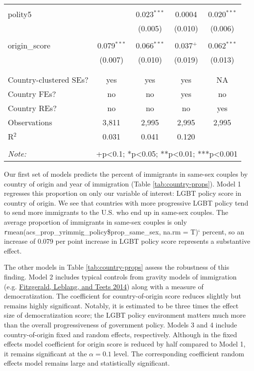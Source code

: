\documentclass[
  11pt,
]{article}
\begin{document}
\begin{table}[!htbp]
\begin{tabular}{@{\extracolsep{5pt}}lcccc}
  & & & & \\ 
 polity5 &  & 0.023$^{***}$ & 0.0004 & 0.020$^{***}$ \\ 
  &  & (0.005) & (0.010) & (0.006) \\ 
  & & & & \\ 
 origin\_score & 0.079$^{***}$ & 0.066$^{***}$ & 0.037$^{+}$ & 0.062$^{***}$ \\ 
  & (0.007) & (0.010) & (0.019) & (0.013) \\ 
  & & & & \\ 
\hline \\[-1.8ex] 
Country-clustered SEs? & yes & yes & yes & NA \\ 
Country FEs? & no & no & yes & no \\ 
Country REs? & no & no & no & yes \\ 
Observations & 3,811 & 2,995 & 2,995 & 2,995 \\ 
R$^{2}$ & 0.031 & 0.041 & 0.120 &  \\ 
\hline 
\hline \\[-1.8ex] 
\textit{Note:}  & \multicolumn{4}{r}{+p<0.1; *p<0.05; **p<0.01; ***p<0.001} \\ 
\end{tabular} 
\end{table}

Our first set of models predicts the percent of immigrants in same-sex couples by country of origin and year of immigration (Table \ref{tab:country-props}). Model 1 regresses this proportion on only our variable of interest: LGBT policy score in country of origin. We see that countries with more progressive LGBT policy tend to send more immigrants to the U.S. who end up in same-sex couples. The average proportion of immigrants in same-sex couples is only \texttt{r}mean(acs\_prop\_yrimmig\_policy\$prop\_same\_sex, na.rm = T)` percent, so an increase of 0.079 per point increase in LGBT policy score represents a substantive effect.

The other models in Table \ref{tab:country-props} assess the robustness of this finding. Model 2 includes typical controls from gravity models of immigration (e.g. \protect\hyperlink{ref-fitzgerald_2014}{Fitzgerald, Leblang, and Teets 2014}) along with a measure of democratization. The coefficient for country-of-origin score reduces slightly but remains highly significant. Notably, it is estimated to be three times the effect size of democratization score; the LGBT policy environment matters much more than the overall progressiveness of government policy. Models 3 and 4 include country-of-origin fixed and random effects, respectively. Although in the fixed effects model coefficient for origin score is reduced by half compared to Model 1, it remains significant at the \(\alpha = 0.1\) level. The corresponding coefficient random effects model remains large and statistically significant.
\end{document}
